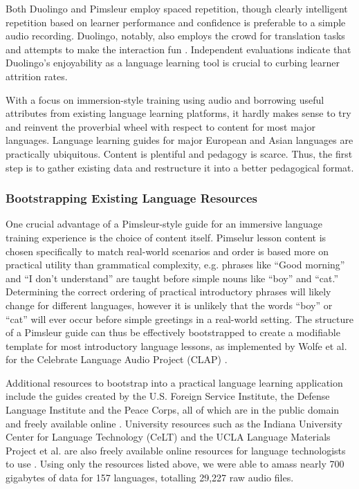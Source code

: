 Both Duolingo and Pimsleur employ spaced repetition, though clearly intelligent repetition based on learner performance and confidence is preferable to a simple audio recording. Duolingo, notably, also employs the crowd for translation tasks and attempts to make the interaction fun \cite{vesselinov2012duolingo} \cite{garcia2013learning}. Independent evaluations indicate that Duolingo's enjoyability as a language learning tool is crucial to curbing learner attrition rates. 

With a focus on immersion-style training using audio and borrowing useful attributes from existing language learning platforms, it hardly makes sense to try and reinvent the proverbial wheel with respect to content for most major languages. Language learning guides for major European and Asian languages are practically ubiquitous. Content is plentiful and pedagogy is scarce. Thus, the first step is to gather existing data and restructure it into a better pedagogical format. 


\subsubsection{Bootstrapping Existing Language Resources}

One crucial advantage of a Pimsleur-style guide for an immersive language training experience is the choice of content itself. Pimselur lesson content is chosen specifically to match real-world scenarios and order is based more on practical utility than grammatical complexity, e.g. phrases like ``Good morning'' and ``I don't understand'' are taught before simple nouns like ``boy'' and ``cat.'' Determining the correct ordering of practical introductory phrases will likely change for different languages, however it is unlikely that the words ``boy'' or ``cat'' will ever occur before simple greetings in a real-world setting. The structure of a Pimsleur guide can thus be effectively bootstrapped to create a modifiable template for most introductory language lessons, as implemented by Wolfe et al. for the Celebrate Language Audio Project (CLAP) \cite{wolfeclap}. 

Additional resources to bootstrap into a practical language learning application include the guides created by the U.S. Foreign Service Institute, the Defense Language Institute and the Peace Corps, all of which are in the public domain and freely available online \cite{peacecorps} \cite{fsi} \cite{livelingua}. University resources such as the Indiana University Center for Language Technology (CeLT) and the UCLA Language Materials Project et al. are also freely available online resources for language technologists to use \cite{ucla} \cite{celt}. Using only the resources listed above, we were able to amass nearly 700 gigabytes of data for 157 languages, totalling 29,227 raw audio files.

